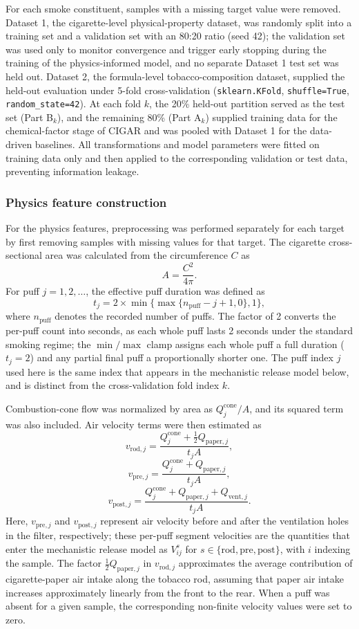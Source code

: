 ﻿\documentclass[a4paper,fleqn]{cas-sc}
\begin{document}
For each smoke constituent, samples with a missing target value were removed.
Dataset 1, the cigarette-level physical-property dataset, was randomly
split into a training set and a validation set with an 80:20 ratio (seed
42); the validation set was used only to monitor convergence and trigger
early stopping during the training of the physics-informed model, and no
separate Dataset 1 test set was held out. Dataset 2, the formula-level
tobacco-composition dataset, supplied the held-out evaluation under 5-fold
cross-validation (\texttt{sklearn.KFold}, \texttt{shuffle=True},
\texttt{random\_state=42}). At each fold $k$, the 20\% held-out partition
served as the test set (Part B$_k$), and the remaining 80\% (Part A$_k$)
supplied training data for the chemical-factor stage of CIGAR and was
pooled with Dataset 1 for the data-driven baselines. All transformations
and model parameters were fitted on training data only and then applied
to the corresponding validation or test data, preventing information
leakage.

\subsubsection{Physics feature construction}

For the physics features, preprocessing was performed separately for each target by first removing samples with missing values for that target. The cigarette cross-sectional area was calculated from the circumference $C$ as
\[
A=\frac{C^2}{4\pi}.
\]
For puff $j=1,2,\ldots$, the effective puff duration was defined as
\[
t_j=2\times\min\{\max\{n_{\mathrm{puff}}-j+1,0\},1\},
\]
where $n_{\mathrm{puff}}$ denotes the recorded number of puffs. The factor of 2 converts the per-puff count into seconds, as each whole puff lasts 2 seconds under the standard smoking regime; the $\min/\max$ clamp assigns each whole puff a full duration ($t_j=2$) and any partial final puff a proportionally shorter one. The puff index $j$ used here is the same index that appears in the mechanistic release model below, and is distinct from the cross-validation fold index $k$.

Combustion-cone flow was normalized by area as $Q_{j}^{\mathrm{cone}}/A$, and its squared term was also included. Air velocity terms were then estimated as
\[
v_{\mathrm{rod},j}=\frac{Q_{j}^{\mathrm{cone}}+\frac{1}{2}Q_{\mathrm{paper},j}}{t_jA},
\]
\[
v_{\mathrm{pre},j}=\frac{Q_{j}^{\mathrm{cone}}+Q_{\mathrm{paper},j}}{t_jA},
\]
\[
v_{\mathrm{post},j}=\frac{Q_{j}^{\mathrm{cone}}+Q_{\mathrm{paper},j}+Q_{\mathrm{vent},j}}{t_jA}.
\]
Here, $v_{\mathrm{pre},j}$ and $v_{\mathrm{post},j}$ represent air velocity before and after the ventilation holes in the filter, respectively; these per-puff segment velocities are the quantities that enter the mechanistic release model as $V_{ij}^{s}$ for $s\in\{\mathrm{rod},\mathrm{pre},\mathrm{post}\}$, with $i$ indexing the sample. The factor $\frac{1}{2}Q_{\mathrm{paper},j}$ in $v_{\mathrm{rod},j}$ approximates the average contribution of cigarette-paper air intake along the tobacco rod, assuming that paper air intake increases approximately linearly from the front to the rear. When a puff was absent for a given sample, the corresponding non-finite velocity values were set to zero.
\end{document}
